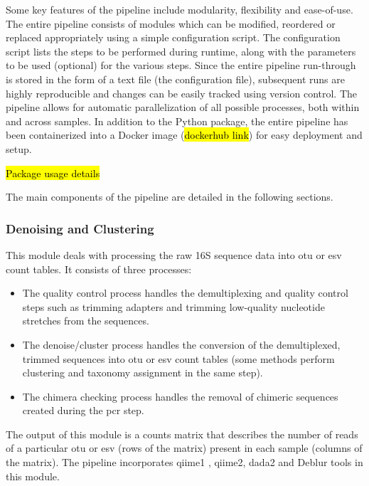   Some key features of the pipeline include modularity, flexibility and ease-of-use.
  The entire pipeline consists of modules which can be modified, reordered or replaced appropriately using a simple configuration script.
  The configuration script lists the steps to be performed during runtime, along with the parameters to be used (optional) for the various steps.
  Since the entire pipeline run-through is stored in the form of a text file (the configuration file), subsequent runs are highly reproducible and changes can be easily tracked using version control.
  The pipeline allows for automatic parallelization of all possible processes, both within and across samples.
  In addition to the Python package, the entire pipeline has been containerized into a Docker \cite{Merkel1994} image (\hl{dockerhub link}) for easy deployment and setup.

  \hl{Package usage details}


  The main components of the pipeline are detailed in the following sections.

  \subsubsection*{Denoising and Clustering}
    \vspace{-5mm}
    This module deals with processing the raw 16S sequence data into \ac{otu} or \ac{esv} count tables.
    It consists of three processes:
    \begin{itemize}
      \item The quality control process handles the demultiplexing and quality control steps such as trimming adapters and trimming low-quality nucleotide stretches from the sequences.
      \item The denoise/cluster process handles the conversion of the demultiplexed, trimmed sequences into \ac{otu} or \ac{esv} count tables (some methods perform clustering and taxonomy assignment in the same step).
      \item The chimera checking process handles the removal of chimeric sequences created during the \ac{pcr} step.
    \end{itemize}
    The output of this module is a counts matrix that describes the number of reads of a particular \ac{otu} or \ac{esv} (rows of the matrix) present in each sample (columns of the matrix).
    The pipeline incorporates \ac{qiime1} \cite{Caporaso2010}, \ac{qiime2}, \ac{dada2} \cite{Callahan2016} and Deblur \cite{Amir2017} tools in this module.

